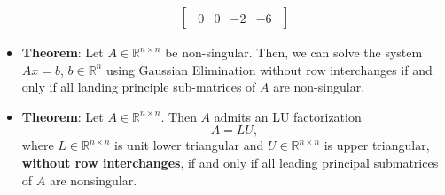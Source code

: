 \documentclass{report}
\begin{document}
\begin{itemize}
\begin{align*}
\begin{bmatrix}
\begin{array}{ccc|c}
                    0 & 0 & -2 & -6
                \end{array}
            \end{bmatrix}
        \end{align*}
    \item \textbf{Theorem}: Let $A \in \mathbb{R}^{n\times n}$ be non-singular. Then, we can solve the system $Ax = b$, $b \in \mathbb{R}^{n}$ using Gaussian Elimination without row interchanges if and only if all landing principle sub-matrices of $A$ are non-singular.
    \item \textbf{Theorem}: Let $A \in \mathbb{R}^{n \times n}$. Then $A$ admits an LU factorization
            \[
                A = LU,
            \]
            where $L \in \mathbb{R}^{n \times n}$ is unit lower triangular and 
            $U \in \mathbb{R}^{n \times n}$ is upper triangular, 
            \textbf{without row interchanges}, if and only if all leading principal 
            submatrices of $A$ are nonsingular.


\end{itemize}
\end{document}
